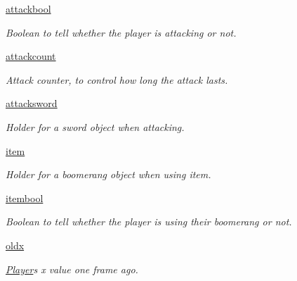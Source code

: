 \begin{DoxyCompactItemize}
\hyperlink{classactor_1_1player_1_1_player_a77d57d979bab2c2918501b536130cd4f}{attackbool}
\begin{DoxyCompactList}\small\item\em Boolean to tell whether the player is attacking or not. \end{DoxyCompactList}\item 
\mbox{\label{classactor_1_1player_1_1_player_a9014fc320d75f42a42067131ef359521}} 
\hyperlink{classactor_1_1player_1_1_player_a9014fc320d75f42a42067131ef359521}{attackcount}
\begin{DoxyCompactList}\small\item\em Attack counter, to control how long the attack lasts. \end{DoxyCompactList}\item 
\hyperlink{classactor_1_1player_1_1_player_a479ddb8958705d9cbd7830e9ba59f8c5}{attacksword}
\begin{DoxyCompactList}\small\item\em Holder for a sword object when attacking. \end{DoxyCompactList}\item 
\mbox{\label{classactor_1_1player_1_1_player_a6c97e5519cba645d52374ef46537b913}} 
\hyperlink{classactor_1_1player_1_1_player_a6c97e5519cba645d52374ef46537b913}{item}
\begin{DoxyCompactList}\small\item\em Holder for a boomerang object when using item. \end{DoxyCompactList}\item 
\mbox{\label{classactor_1_1player_1_1_player_ad03534ba44251c9d8d6b72d2b1cc027e}} 
\hyperlink{classactor_1_1player_1_1_player_ad03534ba44251c9d8d6b72d2b1cc027e}{itembool}
\begin{DoxyCompactList}\small\item\em Boolean to tell whether the player is using their boomerang or not. \end{DoxyCompactList}\item 
\mbox{\label{classactor_1_1player_1_1_player_a1dd72a6eb3f660ee7ae95848e534b5b4}} 
\hyperlink{classactor_1_1player_1_1_player_a1dd72a6eb3f660ee7ae95848e534b5b4}{oldx}
\begin{DoxyCompactList}\small\item\em \hyperlink{classactor_1_1player_1_1_player}{Player}\textquotesingle{}s x value one frame ago. \end{DoxyCompactList}\item 

\end{DoxyCompactItemize}
